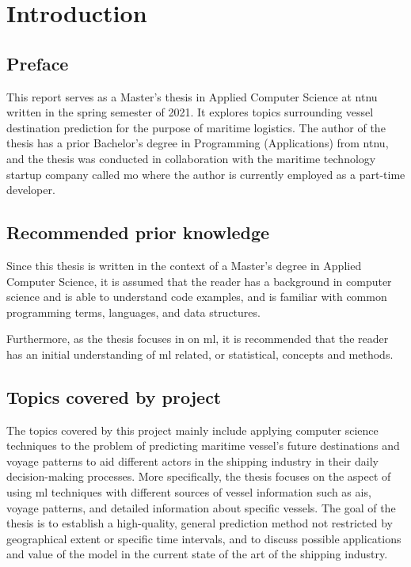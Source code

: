 \chapter{Introduction}

\section{Preface}

This report serves as a Master's thesis in Applied Computer Science at \acrfull{ntnu} written in the spring semester of 2021. It explores topics surrounding vessel destination prediction for the purpose of maritime logistics. The author of the thesis has a prior Bachelor’s degree in Programming (Applications) from \acrshort{ntnu}, and the thesis was conducted in collaboration with the maritime technology startup company called \acrfull{mo} where the author is currently employed as a part-time developer.

\section{Recommended prior knowledge}

Since this thesis is written in the context of a Master's degree in Applied Computer Science, it is assumed that the reader has a background in computer science and is able to understand code examples, and is familiar with common programming terms, languages, and data structures.

Furthermore, as the thesis focuses in on \acrfull{ml}, it is recommended that the reader has an initial understanding of \acrshort{ml} related, or statistical, concepts and methods.

\section{Topics covered by project}
\label{sec:topics_covered}

The topics covered by this project mainly include applying computer science techniques to the problem of predicting maritime vessel's future destinations and voyage patterns to aid different actors in the shipping industry in their daily decision-making processes. More specifically, the thesis focuses on the aspect of using \acrfull{ml} techniques with different sources of vessel information such as \acrfull{ais}, voyage patterns, and detailed information about specific vessels. The goal of the thesis is to establish a high-quality, general prediction method not restricted by geographical extent or specific time intervals, and to discuss possible applications and value of the model in the current state of the art of the shipping industry.


